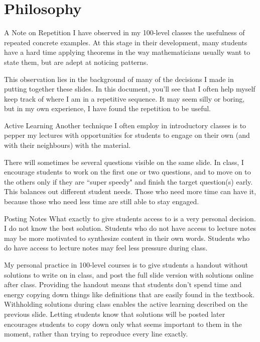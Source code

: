 \documentclass[10pt]{beamer}
\begin{document}
\section{Philosophy}
\begin{frame}{A Note on Repetition}
I have observed in my 100-level classes the usefulness of repeated concrete examples. At this stage in their development, many students have a hard time applying theorems in the way mathematicians usually want to state them, but are adept at noticing patterns.\vfill

This observation lies in the background of many of the decisions I made in putting together these slides. In this document, you'll see that I often help myself keep track of where I am in a repetitive sequence. It may seem silly or boring, but in my own experience, I have found the repetition to be useful.
\end{frame}
\begin{frame}{Active Learning}
Another technique I often employ in introductory classes is to pepper my lectures with opportunities for students to engage on their own (and with their neighbours) with the material. \vfill

There will sometimes be several questions visible on the same slide. In class, I encourage students to work on the first one or two questions, and to move on to the others only if they are ``super speedy" and finish the target question(s) early. This balances out different student needs. Those who need more time can have it, because those who need less time are still able to stay engaged.
\end{frame}
\begin{frame}{Posting Notes}
What exactly to give students access to is a very personal decision.  I do not know the best solution. Students who do not have access to lecture notes may be more motivated to synthesize content in their own words. Students who do have access to lecture notes may feel less pressure during class. 
\vfill

My personal practice in 100-level courses is to give students a handout without solutions to write on in class, and post the full slide version with solutions online after class. Providing the handout means that students don't spend time and energy copying down things like definitions that are easily found in the textbook. Withholding solutions during class enables the active learning described on the previous slide. Letting students know that solutions will be posted later encourages students to copy down only what seems important to them in the moment, rather than trying to reproduce every line exactly.
\end{frame}
\end{document}
